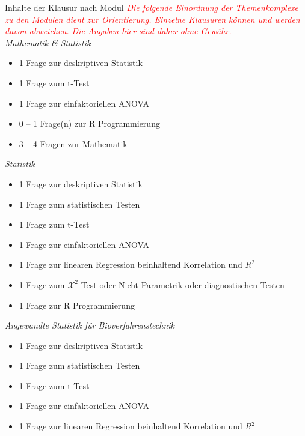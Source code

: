 \documentclass[a4paper, 10pt]{scrartcl}\usepackage[]{graphicx}\usepackage[]{xcolor}
\begin{document}
\maketitle
\thispagestyle{empty}
\clearpage

\begin{graybox}{Inhalte der Klausur nach Modul}  
  \small
  \textcolor{red}{\textit{Die folgende Einordnung der Themenkomplexe zu den Modulen dient zur Orientierung. Einzelne Klausuren k{\"o}nnen und werden davon abweichen. Die Angaben hier sind daher ohne Gew{\"a}hr.}}\\[1Ex]
  \textit{Mathematik \& Statistik} 
  \begin{itemize}
  \item 1 Frage zur deskriptiven Statistik
  \item 1 Frage zum t-Test
  \item 1 Frage zur einfaktoriellen ANOVA
  \item 0 -- 1 Frage(n) zur R Programmierung
  \item 3 -- 4 Fragen zur Mathematik
  \end{itemize} 
  \textit{Statistik} 
  \begin{itemize}
  \item 1 Frage zur deskriptiven Statistik
  \item 1 Frage zum statistischen Testen
  \item 1 Frage zum t-Test
  \item 1 Frage zur einfaktoriellen ANOVA
  \item 1 Frage zur linearen Regression beinhaltend Korrelation und $R^2$
  \item 1 Frage zum $\mathcal{X}^2$-Test oder Nicht-Parametrik oder diagnostischen Testen
  \item 1 Frage zur R Programmierung
  \end{itemize} 
  \textit{Angewandte Statistik f{\"u}r Bioverfahrenstechnik } 
  \begin{itemize}
  \item 1 Frage zur deskriptiven Statistik
  \item 1 Frage zum statistischen Testen
  \item 1 Frage zum t-Test
  \item 1 Frage zur einfaktoriellen ANOVA
  \item 1 Frage zur linearen Regression beinhaltend Korrelation und $R^2$

\end{itemize}
\end{graybox}
\end{document}
